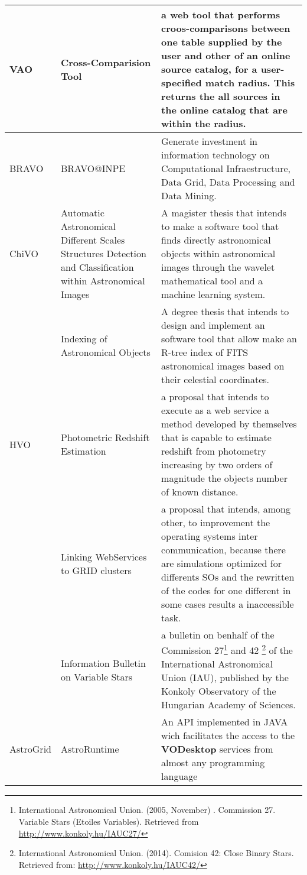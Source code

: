 \begin{table*}[h!t]
	\centering
	\begin{tabular}{|l|p{3cm}|p{12.5cm}|}
	\hline
	VAO 	& Cross-Comparision Tool & a web tool that performs croos-comparisons between one table supplied by the user and other of an online source 
								catalog, for a user-specified match radius. This returns the all sources in the online catalog that are within the radius.\\
	\hline
	BRAVO	& BRAVO@INPE & Generate investment in information technology on Computational Infraestructure, Data Grid, Data Processing and Data Mining.\\
	\hline
	ChiVO	& Automatic Astronomical Different Scales Structures Detection and Classification within Astronomical Images & A magister thesis that intends to 
								make a software tool that finds directly astronomical objects within astronomical images through the wavelet mathematical 
								tool and a machine learning system.\\
			& Indexing of Astronomical Objects & A degree thesis that intends to design and implement an software tool that allow make an R-tree index of 
								FITS astronomical images based on their celestial coordinates. \\
	\hline
	HVO		& Photometric Redshift Estimation & a proposal that intends to execute as a web service a method developed by themselves that is capable to 
								estimate redshift from photometry increasing by two orders of magnitude the objects number of known distance. \\
			& Linking WebServices to GRID clusters & a proposal that intends, among other, to improvement the operating systems inter communication, because 
								there are simulations optimized for differents SOs and the rewritten of the codes for one different in some cases results a 
								inaccessible task.\\
			& Information Bulletin on Variable Stars & a bulletin on benhalf of the Commission 27\footnote{International Astronomical Union. (2005, November)
								. Commission 27. Variable Stars (Etoiles Variables). Retrieved from \url{http://www.konkoly.hu/IAUC27/}} and 42
								\footnote{International Astronomical Union. (2014). Comision 42: Close Binary Stars. Retrieved from: 
								\url{http://www.konkoly.hu/IAUC42/}} of the International Astronomical Union (IAU), published by the Konkoly Observatory 
								of the Hungarian Academy of Sciences. \\
	\hline
	AstroGrid& AstroRuntime & An API implemented in JAVA wich facilitates the access to the \textbf{VODesktop} services from almost any programming language

\end{tabular}
\end{table*}
